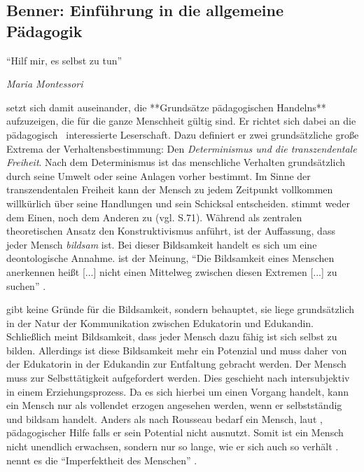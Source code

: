 \subsection{Benner: Einführung in die allgemeine Pädagogik}

\epigraph{
		``Hilf mir, es selbst zu tun''}
	{
		\emph{Maria Montessori
	}

\citeauthor{benner-2012} setzt sich damit auseinander, die **Grundsätze pädagogischen Handelns** aufzuzeigen, die für die ganze Menschheit gültig sind.
Er richtet sich dabei an die pädagogisch~ interessierte Leserschaft.
Dazu definiert er zwei grundsätzliche große Extrema der Verhaltensbestimmung: Den \emph{Determinismus und die transzendentale Freiheit}.
Nach dem Determinismus ist das menschliche Verhalten grundsätzlich durch seine Umwelt oder seine Anlagen vorher bestimmt.
Im Sinne der transzendentalen Freiheit kann der Mensch zu jedem Zeitpunkt vollkommen willkürlich über seine Handlungen und sein Schicksal entscheiden.
\citeauthor{benner-2012} stimmt weder dem Einen, noch dem Anderen zu (vgl. S.71).
Während \citeauthor{siebert-2003} als zentralen theoretischen Ansatz den Konstruktivismus anführt, ist \citeauthor{benner-2012}der Auffassung, dass jeder Mensch \emph{bildsam} ist.
Bei dieser Bildsamkeit handelt es sich um eine deontologische Annahme.
\citeauthor{benner-2012} ist der Meinung, ``Die Bildsamkeit eines Menschen anerkennen  heißt [...] nicht einen Mittelweg zwischen diesen Extremen [...] zu suchen'' \parencite[72]{benner-2012}.

\citeauthor{benner-2012} gibt keine Gründe für die Bildsamkeit, sondern behauptet, sie liege grundsätzlich in der  Natur der Kommunikation zwischen Edukatorin und Edukandin.
Schließlich meint Bildsamkeit, dass jeder Mensch dazu fähig ist sich selbst zu bilden.
Allerdings ist diese Bildsamkeit mehr ein Potenzial und muss daher von der Edukatorin in der Edukandin zur Entfaltung gebracht werden.
Der Mensch muss zur Selbsttätigkeit aufgefordert werden.
Dies geschieht nach \citeauthor{benner-2012} intersubjektiv in einem Erziehungsprozess.
Da es sich hierbei um einen Vorgang handelt, kann ein Mensch nur als vollendet erzogen angesehen werden, wenn er selbstständig und bildsam handelt.
Anders als nach Rousseau bedarf ein Mensch, laut \citeauthor{benner-2012}, pädagogischer Hilfe falls er sein Potential nicht ausnutzt.
Somit ist ein Mensch nicht unendlich erwachsen, sondern nur so lange, wie er sich auch so verhält \parencite[vgl.][91]{benner-2012}.
\citeauthor{benner-2012} nennt es die ``Imperfektheit des Menschen'' \parencite[vgl.][78]{benner-2012}.

}

